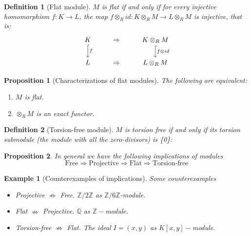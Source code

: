 \documentclass[leqno]{article}
\newtheorem{proposition}{Proposition}
\newtheorem{definition}{Definition}
\newtheorem{example}{Example}
\begin{document}
\begin{definition}[Flat module] $M$ is flat if and only if for every injective homomorphism $f:K\to L$, the map $f \otimes _R id : K\otimes _{R} M \to L\otimes _R M$ is injective, that is:
\[\begin{tikzcd}
	K & \Rightarrow & {K\otimes_RM} \\
	L & \Rightarrow & {L\otimes _R M}
	\arrow["f", hook, from=1-1, to=2-1]
	\arrow["{f\otimes id}", hook, from=1-3, to=2-3]
\end{tikzcd}\]
\end{definition}

\begin{proposition}[Characterizations of flat modules] The following are equivalent:
\begin{enumerate}[topsep=-6pt, itemsep=0pt]
  \item $M$ is flat.
  \item $\otimes _RM$ is an exact functor.
\end{enumerate}
\end{proposition}

\begin{definition}[Torsion-free module] $M$ is torsion free if and only if its torsion submodule (the module with all the zero-divisors) is \{0\}:

\end{definition}

\begin{proposition}
In general we have the following implications of modules
\[
\text{Free} \Rightarrow \text{Projective} \Rightarrow \text{Flat} \Rightarrow \text{Torsion-free}
\] 
\end{proposition}

\begin{example}[Counterexamples of implications] Some counterexamples
\begin{itemize}[topsep=-6pt, itemsep=0pt]
  \item Projective $\nRightarrow$ Free. $\mathbb{Z} / 2\mathbb{Z}$ as  $\mathbb{Z} / 6\mathbb{Z}$-module.
  \item Flat $\nRightarrow$ Projective. $\mathbb{Q}$ as $\mathbb{Z}-$module.
  \item Torsion-free $\nRightarrow$ Flat. The ideal $I=(x,y)$ as $K[x, y]-$module.
\end{itemize}
\end{example}
\end{document}
